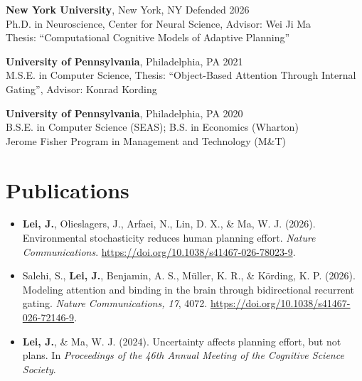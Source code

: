 \documentclass[10pt]{article}
\begin{document}
\textbf{New York University}, New York, NY \hfill Defended 2026 \\
Ph.D. in Neuroscience, Center for Neural Science, Advisor: Wei Ji Ma \\
Thesis: ``Computational Cognitive Models of Adaptive Planning''

\textbf{University of Pennsylvania}, Philadelphia, PA \hfill 2021 \\
M.S.E. in Computer Science, Thesis: ``Object-Based Attention Through Internal Gating'', Advisor: Konrad Kording

\textbf{University of Pennsylvania}, Philadelphia, PA \hfill 2020 \\
B.S.E. in Computer Science (SEAS); B.S. in Economics (Wharton) \\
Jerome Fisher Program in Management and Technology (M\&T)

\section{Publications}
\begin{itemize}
    \item \textbf{Lei, J.}, Olieslagers, J., Arfaei, N., Lin, D. X., \& Ma, W. J. (2026). Environmental stochasticity reduces human planning effort. \textit{Nature Communications}. \url{https://doi.org/10.1038/s41467-026-78023-9}.
    \item Salehi, S., \textbf{Lei, J.}, Benjamin, A. S., Müller, K. R., \& Körding, K. P. (2026). Modeling attention and binding in the brain through bidirectional recurrent gating. \textit{Nature Communications, 17}, 4072. \url{https://doi.org/10.1038/s41467-026-72146-9}.
    \item \textbf{Lei, J.}, \& Ma, W. J. (2024). Uncertainty affects planning effort, but not plans. In \textit{Proceedings of the 46th Annual Meeting of the Cognitive Science Society}.
\end{itemize}

\end{document}
